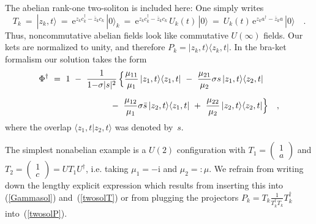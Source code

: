 \documentclass[a4paper,11pt]{article}
\numberwithin{equation}{section}
\def\s{\sigma}
\def\e{\mbox{e}}
\def\i{\mbox{i}}
\newcommand{\adag}{a^{\dagger}}
\newcommand{\cdag}{c^{\dagger}}
\newcommand{\Tdag}{T^{\dagger}}
\newcommand{\zb}{\overline{z}}
\begin{document}
The abelian rank-one two-soliton is included here:
One simply writes
\begin{equation}
T_k\ =\ |z_k,t\rangle\ =\ \e^{z_k \cdag_k -\zb_k c_k}\,|0\rangle_k\ =\
\e^{z_k \cdag_k -\zb_k c_k}\,U_k(t)\,|0\rangle\ =\
U_k(t)\,\e^{z_k \adag -\zb_k a}\,|0\rangle \quad.
\end{equation}
Thus, noncommutative abelian fields look like commutative $U(\infty)$ fields.
Our kets are normalized to unity, and therefore
$P_k=|z_k,t\rangle\langle z_k,t|$.
In the bra-ket formalism our solution takes the form
\begin{align}
\Phi^\dagger\ =\ 1\ &-\
\frac{1}{1{-}\s|s|^2}\,\Bigl\{
\frac{\mu_{11}}{\mu_1}\,|z_1,t\rangle\langle z_1,t|\ -\
\frac{\mu_{21}}{\mu_2}\s s\,|z_1,t\rangle\langle z_2,t|
\nonumber\\[6pt] &\qquad\qquad\ -\
\frac{\mu_{12}}{\mu_1}\s \bar{s}\,|z_2,t\rangle\langle z_1,t|\ +\
\frac{\mu_{22}}{\mu_2}\,|z_2,t\rangle\langle z_2,t|\Bigr\} \quad,
\label{twosolabel}
\end{align}
where the overlap $\langle z_1,t|z_2,t\rangle$ was denoted by~$s$.

The simplest nonabelian example is a $U(2)$ configuration with
$T_1=(\begin{smallmatrix} 1 \\ a \end{smallmatrix})$ and
$T_2=(\begin{smallmatrix} 1 \\ c \end{smallmatrix})=UT_1 U^\dagger$,
i.e. taking $\mu_1=-\i$ and $\mu_2=:\mu$.
We refrain from writing down the lengthy explicit expression which
results from inserting this into (\ref{Gammasol}) and~(\ref{twosolT})
or from plugging the projectors $P_k=T_k\frac{1}{\Tdag_k T_k}\Tdag_k$
into~(\ref{twosolP}).
\end{document}
